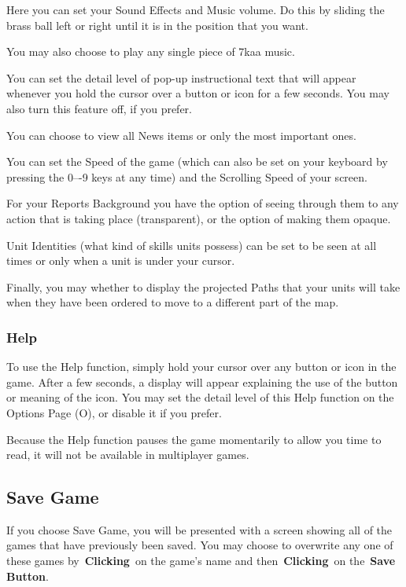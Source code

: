 Here you can set your Sound Effects and Music volume. Do this by sliding the brass ball left or right until it is in the position that you want.

You may also choose to play any single piece of 7kaa music.

You can set the detail level of pop-up instructional text that will appear whenever you hold the cursor over a button or icon for a few seconds. You may also turn this feature off, if you prefer.

You can choose to view all News items or only the most important ones.

You can set the Speed of the game (which can also be set on your keyboard by pressing the 0–-9 keys at any time) and the Scrolling Speed of your screen.

For your Reports Background you have the option of seeing through them to any action that is taking place (transparent), or the option of making them opaque.

Unit Identities (what kind of skills units possess) can be set to be seen at all times or only when a unit is under your cursor.

Finally, you may whether to display the projected Paths that your units will take when they have been ordered to move to a different part of the map.

\subsubsection{Help}

To use the Help function, simply hold your cursor over any button or icon in the game. After a few seconds, a display will appear explaining the use of the button or meaning of the icon. You may set the detail level of this Help function on the Options Page (O), or disable it if you prefer.

Because the Help function pauses the game momentarily to allow you time to read, it will not be available in multiplayer games.

\subsection{Save Game}

If you choose Save Game, you will be presented with a screen showing all of the games that have previously been saved. You may choose to overwrite any one of these games by \textbf{Clicking} on the game’s name and then \textbf{Clicking} on the \textbf{Save Button}.

